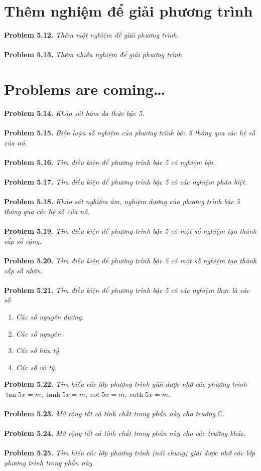 \documentclass[a4paper,oneside]{book}
\numberwithin{equation}{chapter}
\begin{document}
\section{Thêm nghiệm để giải phương trình}
\textbf{Problem 5.12.} \textit{Thêm một nghiệm để giải phương trình.}\\
\\
\textbf{Problem 5.13.} \textit{Thêm nhiều nghiệm để giải phương trình.}
\section{Problems are coming\ldots}
\textbf{Problem 5.14.} \textit{Khảo sát hàm đa thức bậc 5.}\\
\\
\textbf{Problem 5.15.} \textit{Biện luận số nghiệm của phương trình bậc 5 thông qua các hệ số của nó.}\\
\\
\textbf{Problem 5.16.} \textit{Tìm điều kiện để phương trình bậc 5 có nghiệm bội.}\\
\\
\textbf{Problem 5.17.} \textit{Tìm điều kiện để phương trình bậc 5 có các nghiệm phân biệt.}\\
\\
\textbf{Problem 5.18.} \textit{Khảo sát nghiệm âm, nghiệm dương của phương trình bậc 5 thông qua các hệ số của nó.}\\
\\
\textbf{Problem 5.19.} \textit{Tìm điều kiện để phương trình bậc 5 có một số nghiệm tạo thành cấp số cộng.}\\
\\
\textbf{Problem 5.20.} \textit{Tìm điều kiện để phương trình bậc 5 có một số nghiệm tạo thành cấp số nhân.}\\
\\
\textbf{Problem 5.21.} \textit{Tìm điều kiện để phương trình bậc 5 có các nghiệm thực là các số}
\begin{enumerate}
\item \textit{Các số nguyên dương.}
\item \textit{Các số nguyên.}
\item \textit{Các số hữu tỷ.}
\item \textit{Các số vô tỷ.}
\end{enumerate}
\textbf{Problem 5.22.} \textit{Tìm hiểu các lớp phương trình giải được nhờ các phương trình $\tan 5x = m,\tanh 5x = m,\cot 5x = m,\coth 5x = m$.}\\
\\
\textbf{Problem 5.23.} \textit{Mở rộng tất cả tính chất trong phần này cho trường $\mathbb{C}$}.\\
\\
\textbf{Problem 5.24.} \textit{Mở rộng tất cả tính chất trong phần này cho các trường khác.}\\
\\
\textbf{Problem 5.25.} \textit{Tìm hiểu các lớp phương trình (nói chung) giải được nhờ các lớp phương trình trong phần này.}
\end{document}
